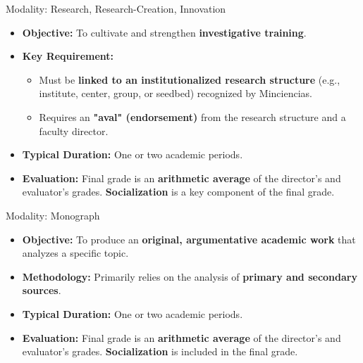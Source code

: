    \begin{frame}{Modality: Research, Research-Creation, Innovation}
      \begin{itemize}
        \item<1-> \textbf{Objective:} To cultivate and strengthen \textbf{investigative training}.
        \item<2-> \textbf{Key Requirement:}
          \begin{itemize}
            \item<3-> Must be \textbf{linked to an institutionalized research structure} (e.g., institute, center, group, or seedbed) recognized by Minciencias.
            \item<4-> Requires an \textbf{"aval" (endorsement)} from the research structure and a faculty director.
          \end{itemize}
        \item<5-> \textbf{Typical Duration:} One or two academic periods.
        \item<6-> \textbf{Evaluation:} Final grade is an \textbf{arithmetic average} of the director's and evaluator's grades. \textbf{Socialization} is a key component of the final grade.
      \end{itemize}
    \end{frame}

    \begin{frame}{Modality: Monograph}
      \begin{itemize}
        \item<1-> \textbf{Objective:} To produce an \textbf{original, argumentative academic work} that analyzes a specific topic.
        \item<2-> \textbf{Methodology:} Primarily relies on the analysis of \textbf{primary and secondary sources}.
        \item<3-> \textbf{Typical Duration:} One or two academic periods.
        \item<4-> \textbf{Evaluation:} Final grade is an \textbf{arithmetic average} of the director's and evaluator's grades. \textbf{Socialization} is included in the final grade.
      \end{itemize}
    \end{frame}


